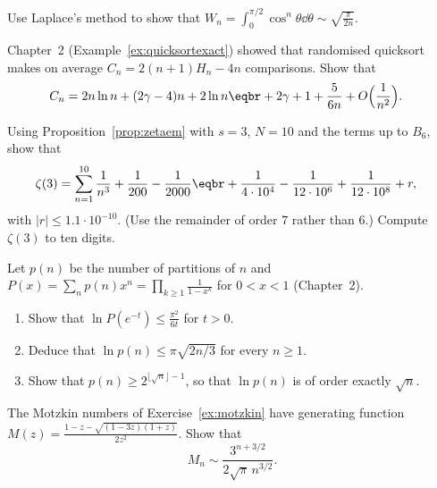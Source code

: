 \begin{exercise}[$\star$]\label{ex:wallislaplace}
Use Laplace's method to show that $W_n=\int_0^{\pi/2}\cos^n\theta\dd\theta\sim\sqrt{\frac\pi{2n}}$.
\end{exercise}

\begin{exercise}[$\star\star$]\label{ex:quickexp}
Chapter~2 (Example~\ref{ex:quicksortexact}) showed that randomised quicksort makes on average $C_n=2(n+1)H_n-4n$ comparisons. Show that
\[
\begin{aligned}C_n&=2n\ln n+(2\gamma-4)n+2\ln n\eqbr+2\gamma+1+\frac5{6n}+O\Bigl(\frac1{n^2}\Bigr).\end{aligned}
\]
\end{exercise}

\begin{exercise}[$\star\star$]\label{ex:zeta3}
Using Proposition~\ref{prop:zetaem} with $s=3$, $N=10$ and the terms up to $B_6$, show that
\[
\begin{aligned}\zeta(3)&=\sum_{n=1}^{10}\frac1{n^3}+\frac1{200}-\frac1{2000}\eqbr+\frac1{4\cdot10^4}-\frac1{12\cdot10^6}+\frac1{12\cdot10^8}+r,\end{aligned}
\]
with $|r|\le1.1\cdot10^{-10}$. (Use the remainder of order $7$ rather than $6$.) Compute $\zeta(3)$ to ten digits.
\end{exercise}

\begin{exercise}[$\star\star$]\label{ex:partitionbound}
Let $p(n)$ be the number of partitions of $n$ and $P(x)=\sum_np(n)x^n=\prod_{k\ge1}\frac1{1-x^k}$ for $0<x<1$ (Chapter~2).
\begin{enumerate}[label=(\alph*)]
\item Show that $\ln P(e^{-t})\le\frac{\pi^2}{6t}$ for $t>0$.
\item Deduce that $\ln p(n)\le\pi\sqrt{2n/3}$ for every $n\ge1$.
\item Show that $p(n)\ge2^{\lfloor\sqrt n\rfloor-1}$, so that $\ln p(n)$ is of order exactly $\sqrt n$.
\end{enumerate}
\end{exercise}

\begin{exercise}[$\star\star$]\label{ex:motzkinasym}
The Motzkin numbers of Exercise~\ref{ex:motzkin} have generating function $M(z)=\frac{1-z-\sqrt{(1-3z)(1+z)}}{2z^2}$. Show that
\[
M_n\sim\frac{3^{n+3/2}}{2\sqrt\pi\,n^{3/2}}.
\]
\end{exercise}

